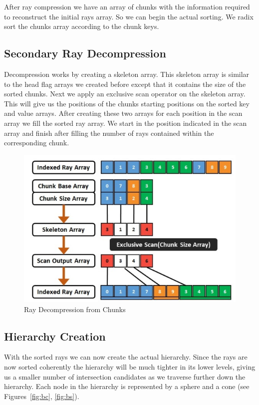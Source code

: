 After ray compression we have an array of chunks with the information required to reconstruct the initial rays array. So we can begin the actual sorting. We radix sort \cite{Merrill11} the chunks array according to the chunk keys.

\subsection{Secondary Ray Decompression}

Decompression works by creating a skeleton array. This skeleton array is similar to the head flag arrays we created before except that it contains the size of the sorted chunks. Next we apply an exclusive scan operator on the skeleton array. This will give us the positions of the chunks starting positions on the sorted key and value arrays. After creating these two arrays for each position in the scan array we fill the sorted ray array. We start in the position indicated in the scan array and finish after filling the number of rays contained within the corresponding chunk.

\begin{figure}[!htb]
    \centering
    \includegraphics[scale=0.75]{Images/Ray_Decompression}
    \caption{Ray Decompression from Chunks}
\end{figure}

\subsection{Hierarchy Creation}

With the sorted rays we can now create the actual hierarchy. Since the rays are now sorted coherently the hierarchy will be much tighter in its lower levels, giving us a smaller number of intersection candidates as we traverse further down the hierarchy.
Each node in the hierarchy is represented by a sphere and a cone (see Figures~\ref{fig:bc}, \ref{fig:bs}).

